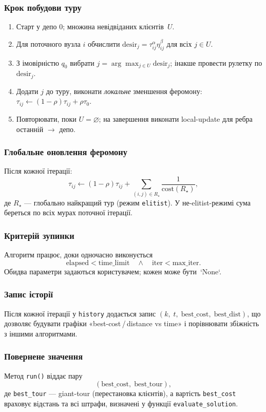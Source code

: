\documentclass[12pt,a4paper]{article}
\begin{document}
\subsubsection{Крок побудови туру}
\begin{enumerate}
  \item Старт у депо \(0\); множина невідвіданих клієнтів~\(U\).
  \item Для поточного вузла \(i\) обчислити
        \(\text{desir}_j=\tau_{ij}^{\alpha}\eta_{ij}^{\beta}\) для
        всіх \(j\in U\).
  \item З імовірністю \(q_0\) вибрати
        \(j=\arg\max_{j\in U}\text{desir}_j\);  
        інакше провести рулетку по \(\text{desir}_j\).
  \item Додати \(j\) до туру, виконати \emph{локальне} зменшення
        феромону:  
        \(\tau_{ij}\leftarrow(1-\rho)\tau_{ij}+\rho\tau_0\).
  \item Повторювати, поки \(U=\varnothing\);  
        на завершення виконати local-update для ребра
        останній $\to$ депо.
\end{enumerate}

\subsubsection{Глобальне оновлення феромону}
Після кожної ітерації:
\[
\tau_{ij}\leftarrow(1-\rho)\tau_{ij} 
      + \sum_{(i,j)\in R_\star}\frac{1}{\text{cost}(R_\star)},
\]
де $R_\star$ — глобально найкращий тур (режим \texttt{elitist}).
У не-elitist-режимі сума береться по всіх мурах поточної ітерації.

\subsubsection{Критерій зупинки}
Алгоритм працює, доки одночасно виконується
\[
\text{elapsed}<\text{time\_limit}\quad\land\quad
\text{iter}<\text{max\_iter}.
\]
Обидва параметри задаються користувачем; кожен може бути~`None`.

\subsubsection{Запис історії}
Після кожної ітерації у \texttt{history} додається запис
\((k,\;t,\;\text{best\_cost},\;\text{best\_dist})\),  
що дозволяє будувати графіки «best-cost / distance vs time»
і порівнювати збіжність з іншими алгоритмами.

\subsubsection{Повернене значення}
Метод \texttt{run()} віддає пару
\[
(\text{best\_cost},\;\text{best\_tour}),
\]
де \texttt{best\_tour} — giant-tour (перестановка клієнтів),
а вартість \texttt{best\_cost} враховує відстань та всі штрафи,
визначені у функції \texttt{evaluate\_solution}.
\end{document}
